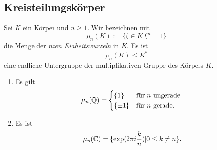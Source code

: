\documentclass{book}
\begin{document}
\subsection{Kreisteilungskörper}%
\label{sub:kreisteilungskorper}

Sei $K$ ein Körper und $n \ge 1$. Wir bezeichnen mit 
\[
    \mu_n(K) := \{ \xi \in K | \xi^n = 1\}
\]
die Menge der {\em $n$ten Einheitswurzeln} in $K$. Es ist
\[
    \mu_n(K) \le K^*
\]
eine endliche Untergruppe der multiplikativen Gruppe des Körpers $K$. 

\begin{exa}
    \label{exa:ewqc}
    \begin{enumerate}
        \item Es gilt
            \[
                \mu_n(\mathbb{Q}) = 
                \begin{cases} 
                    \{1\} & \text{für $n$ ungerade,}\\
                    \{ \pm 1 \} & \text{für $n$ gerade.} 
                \end{cases}
            \]
        \item Es ist
            \[
                \mu_n(\mathbb{C}) = \{ \exp(2 \pi i \frac{k}{n}) | 0 \le k \ne n\} .
            \]
    \end{enumerate}
\end{exa}
\end{document}
